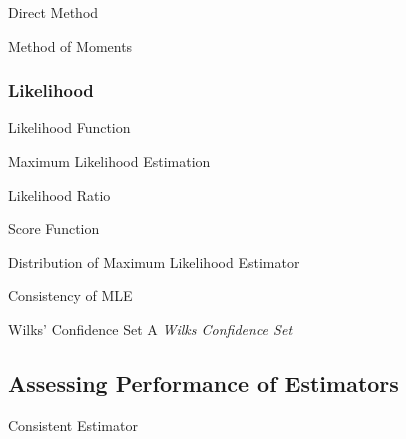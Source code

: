 \documentclass[11pt,a4paper]{article}
\begin{document}
\begin{definition}{Direct Method}
\end{definition}

\begin{definition}{Method of Moments}

\end{definition}

\subsubsection{Likelihood}

\begin{definition}{Likelihood Function}
\end{definition}

\begin{definition}{Maximum Likelihood Estimation}
\end{definition}

\begin{definition}{Likelihood Ratio}
\end{definition}

\begin{definition}{Score Function}

\end{definition}

\begin{theorem}{Distribution of Maximum Likelihood Estimator}

\end{theorem}

\begin{remark}{Consistency of MLE}

\end{remark}

\begin{definition}{Wilks' Confidence Set}
  A \textit{Wilks Confidence Set}
\end{definition}

\subsection{Assessing Performance of Estimators}

\begin{definition}{Consistent Estimator}

\end{definition}
\end{document}
